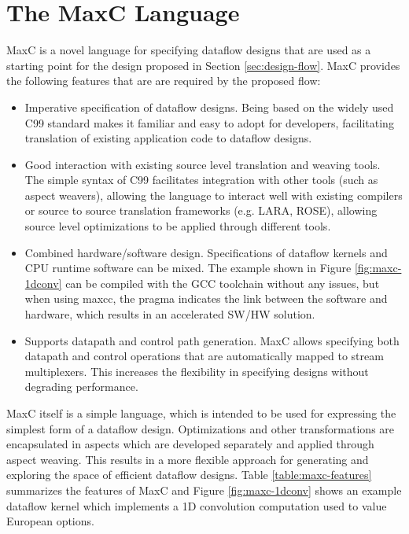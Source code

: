 \section{The  MaxC Language}
\label{sec:maxc}

MaxC is a novel language for specifying dataflow designs that are used
as a starting point for the design proposed in Section
\ref{sec:design-flow}. MaxC provides the following features that are
are required by the proposed flow:

\begin{itemize}
\item Imperative specification of dataflow designs. Being based on the
  widely used C99 standard makes it familiar and easy to adopt for
  developers, facilitating translation of existing application code to
  dataflow designs.
\item Good interaction with existing source level translation and
  weaving tools. The simple syntax of C99 facilitates integration with
  other tools (such as aspect weavers), allowing the language to
  interact well with existing compilers or source to source
  translation frameworks (e.g. LARA, ROSE), allowing source level
  optimizations to be applied through different tools.
\item Combined hardware/software design. Specifications of dataflow
  kernels and CPU runtime software can be mixed. The example shown in
  Figure \ref{fig:maxc-1dconv} can be compiled with the GCC toolchain
  without any issues, but when using maxcc, the pragma indicates the
  link between the software and hardware, which results in an
  accelerated SW/HW solution.
\item Supports datapath and control path generation. MaxC allows
  specifying both datapath and control operations that are
  automatically mapped to stream multiplexers. This increases the
  flexibility in specifying designs without degrading performance.
\end{itemize}

MaxC itself is a simple language, which is intended to be used for
expressing the simplest form of a dataflow design. Optimizations and
other transformations are encapsulated in aspects which are developed
separately and applied through aspect weaving. This results in a more
flexible approach for generating and exploring the space of efficient
dataflow designs. Table \ref{table:maxc-features} summarizes the
features of MaxC and Figure \ref{fig:maxc-1dconv} shows an example
dataflow kernel which implements a 1D convolution computation used to
value European options.

